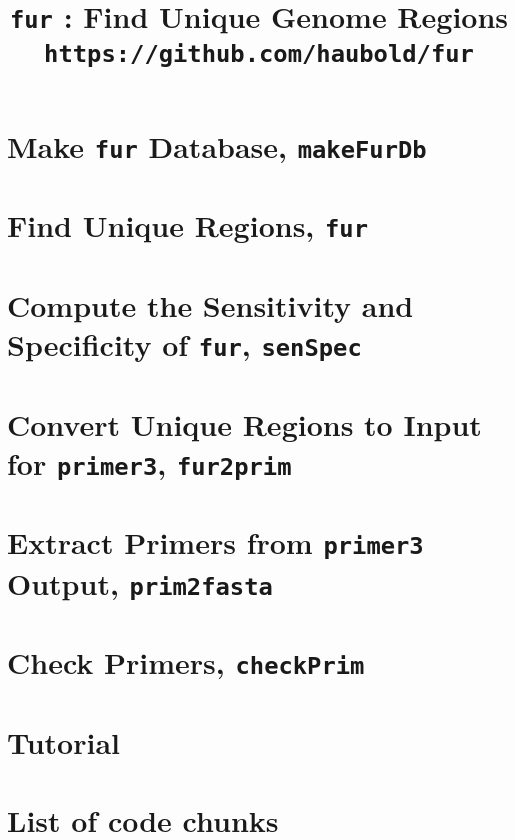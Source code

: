 

\frontmatter
\pagestyle{noweb}

\title{\texttt{fur} : Find Unique Genome
Regions\\\small \texttt{https://github.com/haubold/fur}}
\author{}
\maketitle

\tableofcontents
\listoftheorems[show={tdefn}]
\mainmatter
\chapter{Make \texttt{fur} Database, \texttt{makeFurDb}}\label{ch:makeFurDb}

\chapter{Find Unique Regions, \texttt{fur}}

\chapter{Compute the Sensitivity and Specificity
of \texttt{fur}, \texttt{senSpec}}\label{ch:senSpec}

\chapter{Convert Unique Regions to Input for \texttt{primer3}, \texttt{fur2prim}}

\chapter{Extract Primers from \texttt{primer3}
Output, \texttt{prim2fasta}}

\chapter{Check Primers, \texttt{checkPrim}}

\chapter{Tutorial}\label{ch:tut}


\backmatter
\chapter{List of code chunks}
\nowebchunks



